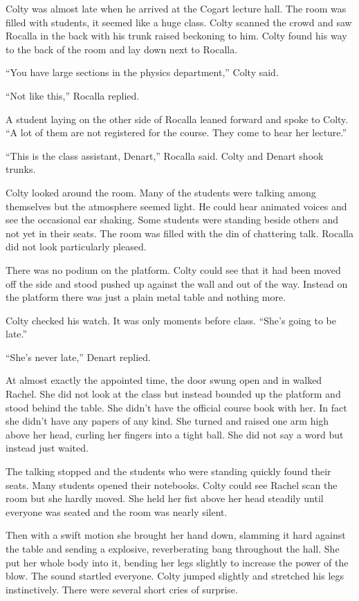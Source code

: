 
Colty was almost late when he arrived at the Cogart lecture hall. The room was filled with
students, it seemed like a huge class. Colty scanned the crowd and saw Rocalla in the back with
his trunk raised beckoning to him. Colty found his way to the back of the room and lay down next
to Rocalla.

``You have large sections in the physics department,'' Colty said.

``Not like this,'' Rocalla replied.

A student laying on the other side of Rocalla leaned forward and spoke to Colty. ``A lot of
them are not registered for the course. They come to hear her lecture.''

``This is the class assistant, Denart,'' Rocalla said. Colty and Denart shook trunks.

Colty looked around the room. Many of the students were talking among themselves but the
atmosphere seemed light. He could hear animated voices and see the occasional ear shaking. Some
students were standing beside others and not yet in their seats. The room was filled with the
din of chattering talk. Rocalla did not look particularly pleased.

There was no podium on the platform. Colty could see that it had been moved off the side and
stood pushed up against the wall and out of the way. Instead on the platform there was just a
plain metal table and nothing more.

Colty checked his watch. It was only moments before class. ``She's going to be late.''

``She's never late,'' Denart replied.

At almost exactly the appointed time, the door swung open and in walked Rachel. She did not look
at the class but instead bounded up the platform and stood behind the table. She didn't have the
official course book with her. In fact she didn't have any papers of any kind. She turned and
raised one arm high above her head, curling her fingers into a tight ball. She did not say a
word but instead just waited.

The talking stopped and the students who were standing quickly found their seats. Many students
opened their notebooks. Colty could see Rachel scan the room but she hardly moved. She held her
fist above her head steadily until everyone was seated and the room was nearly silent.

Then with a swift motion she brought her hand down, slamming it hard against the table and
sending a explosive, reverberating bang throughout the hall. She put her whole body into it,
bending her legs slightly to increase the power of the blow. The sound startled everyone. Colty
jumped slightly and stretched his legs instinctively. There were several short cries of
surprise.

